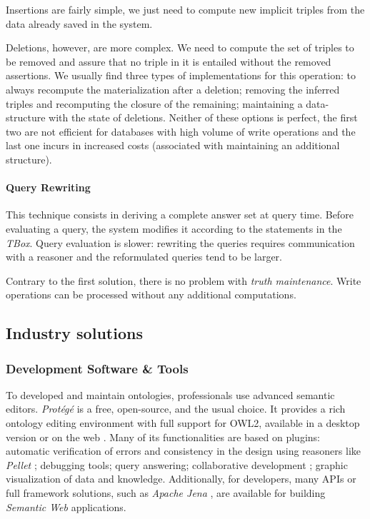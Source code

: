 Insertions are fairly simple, we just need to compute new implicit triples from the data already saved in the system.

Deletions, however, are more complex. We need to compute the set of triples to be removed and assure that no triple in it is entailed without the removed assertions. We usually find three types of implementations for this operation: to always recompute the materialization after a deletion; removing the inferred triples and recomputing the closure of the remaining; maintaining a data-structure with the state of deletions. Neither of these options is perfect, the first two are not efficient for databases with high volume of write operations and the last one incurs in increased costs (associated with maintaining an additional structure).

\paragraph{Query Rewriting} This technique consists in deriving a complete answer set at query time. Before evaluating a query, the system modifies it according to the statements in the \emph{TBox}. Query evaluation is slower: rewriting the queries requires communication with a reasoner and the reformulated queries tend to be larger.

Contrary to the first solution, there is no problem with \emph{truth maintenance}. Write operations can be processed without any additional computations. 


\subsection{Industry solutions}
\label{ch2:sec:semantic-web:tools}

\subsubsection{Development Software \& Tools} 
To developed and maintain ontologies, professionals use advanced semantic editors. \emph{Protégé} \autocite{Musen2015-kh} is a free, open-source, and the usual choice. It provides a rich ontology editing environment with full support for \gls{OWL2}, available in a desktop version or on the web \autocite{Tudorache2009-ja}. Many of its functionalities are based on plugins: automatic verification of errors and consistency in the design using reasoners like \emph{Pellet} \autocite{Sirin2007-lo}; debugging tools; query answering; collaborative development \autocite{Tudorache2008-tu}; graphic visualization of data and knowledge. Additionally, for developers, many \gls{API}s \autocite{Owlcs_undated-im} or full framework solutions, such as \emph{Apache Jena} \autocite{The_Apache_Software_Foundation_undated-wk}, are available for building \emph{Semantic Web} applications.


